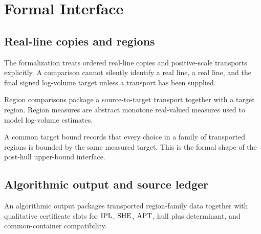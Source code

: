 \chapter{Formal Interface}
\label{ch:formal-interface}

\section{Real-line copies and regions}

\begin{definition}
  \label{def:real-line-copies}
  \leanok
  The formalization treats ordered real-line copies and positive-scale
  transports explicitly.  A comparison cannot silently identify a
  \ThetaPilot{} real line, a \qPilot{} real line, and the final signed
  log-volume target unless a transport has been supplied.
\end{definition}

\begin{definition}
  \label{def:regions-and-measures}
  \leanok
  Region comparisons package a source-to-target transport together with a
  target region.  Region measures are abstract monotone real-valued measures
  used to model log-volume estimates.
\end{definition}

\begin{definition}
  \label{def:common-target-bound}
  \leanok
  A common target bound records that every choice in a family of transported
  regions is bounded by the same measured target.  This is the formal shape of
  the post-hull upper-bound interface.
\end{definition}

\section{Algorithmic output and source ledger}

\begin{definition}
  \label{def:algorithmic-output}
  \leanok
  An algorithmic output packages transported region-family data together with
  qualitative certificate slots for \(\mathrm{IPL}\), \(\mathrm{SHE}\), \(\mathrm{APT}\), hull plus
  determinant, and common-container compatibility.
\end{definition}

